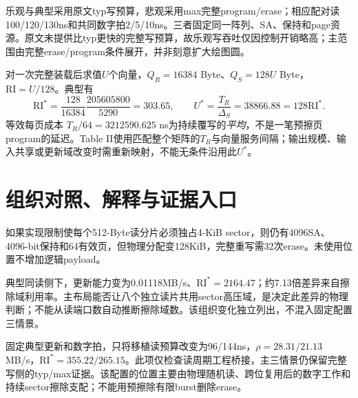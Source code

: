 
乐观与典型采用原文typ写预算，悲观采用max完整program/erase；相应配对读100/120/130ns和共同数字拍2/5/10ns。三者固定同一阵列、SA、保持和page资源。原文未提供比typ更快的完整写预算，故乐观写吞吐仅因控制开销略高；主范围由完整erase/program条件展开，并非刻意扩大绘图圆。

对一次完整装载后求值$U$个向量，$Q_R=16384$ Byte、$Q_S=128U$ Byte，$\mathrm{RI}=U/128$。典型有
\[
\mathrm{RI}^*=\frac{128}{16384}\frac{205605800}{5290}=303.65,
\qquad U^*=\frac{T_R}{\Delta_S}=38866.88=128\mathrm{RI}^*.
\]
等效每页成本 $T_R/64=3212590.625$ ns为持续覆写的\emph{平均}，不是一笔预擦页program的延迟。Table II使用匹配整个矩阵的$T_R$与向量服务间隔；输出规模、输入共享或更新域改变时需重新映射，不能无条件沿用此$U^*$。

\clearpage
\section{组织对照、解释与证据入口}

如果实现限制使每个512-Byte读分片必须独占4-KiB sector，则仍有4096SA、4096-bit保持和64有效页，但物理分配变128KiB，完整重写需32次erase。未使用位置不增加逻辑payload。


典型同读侧下，更新能力变为0.01118MB/s、$\mathrm{RI}^*=2164.47$；约7.13倍差异来自擦除域利用率。主布局能否让八个独立读片共用sector高压域，是决定此差异的物理判断；不能从读端口数自动推断擦除域数。该组织变化独立列出，不混入固定配置三情景。

固定典型更新和数字拍，只将移植读预算改变为96/144ns，$\rho=28.31/21.13$ MB/s，$\mathrm{RI}^*=355.22/265.15$。此项仅检查读周期工程桥接，主三情景仍保留完整写侧的typ/max证据。该配置的位置主要由物理随机读、跨位复用后的数字工作和持续sector擦除支配；不能用预擦除有限burst删除erase。

